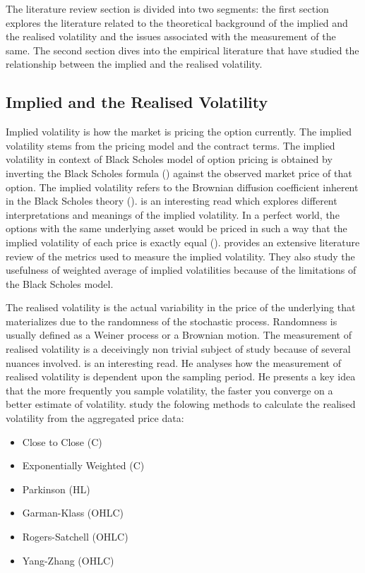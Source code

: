 The literature review section is divided into two segments: the first section explores the literature related to the theoretical background of the implied and the realised volatility and the issues associated with the measurement of the same. The second section dives into the empirical literature that have studied the relationship between the implied and the realised volatility. 

\subsection{Implied and the Realised Volatility}
Implied volatility is how the market is pricing the option currently. The implied volatility stems from the pricing model and the contract terms. The implied volatility in context of Black Scholes model of option pricing is obtained by inverting the Black Scholes formula (\cite{black1973pricing}) against the observed market price of that option. The implied volatility refers to the Brownian diffusion coefficient inherent in the Black Scholes theory (\cite{Ayache2024}). \cite{Ayache2024} is an interesting read which explores different interpretations and meanings of the implied volatility. In a perfect \cite{black1973pricing} world, the options with the same underlying asset would be priced in such a way that the implied volatility of each price is exactly equal (\cite{mayhew1995implied}). \cite{mayhew1995implied} provides an extensive literature review of the metrics used to measure the implied volatility. They also study the usefulness of weighted average of implied volatilities because of the limitations of the Black Scholes model. 

The realised volatility is the actual variability in the price of the underlying that materializes due to the randomness of the stochastic process.  Randomness is usually defined as a Weiner process or a Brownian motion.
The measurement of realised volatility is a deceivingly non trivial subject of study because of several nuances involved. \cite{abdelmessih2024volatility} is an interesting read. He analyses how the measurement of realised volatility is dependent upon the sampling period. He presents a key idea that the more frequently you sample volatility, the faster you converge on a better estimate of volatility. \cite{bennett2012measuring} study the folowing methods to calculate the realised volatility from the aggregated price data:

\begin{itemize}
	\item Close to Close (C)
	\item Exponentially Weighted (C)
	\item Parkinson (HL)
	\item Garman-Klass (OHLC)
	\item Rogers-Satchell (OHLC)
	\item Yang-Zhang (OHLC)
\end{itemize}

